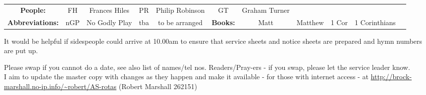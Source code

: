 \documentclass[10pt]{article}
\begin{document}
\begin{center}
\vspace{1em}
\begin{tabular}{|c|c|c|c|c|c|c|c|c|c|c|}\hline
{\bf People: } &
 FH & Frances Hiles &
PR & Philip Robinson &
 GT & Graham Turner & & & \\ %
{\bf Abbreviations:}
& nGP & No Godly Play 
& tba & to be arranged 
& {\bf Books: } & Matt & Matthew  & 1 Cor & 1 Corinthians\\
     \hline
  \end{tabular}
\end{center}
\begin{minipage}{0.7\textwidth}
{\footnotesize It would be helpful if sidespeople 
could arrive at 10.00am to ensure that service sheets and notice sheets are 
prepared and hymn numbers are put up.

Please swap if you cannot do a date, see also list of names/tel nos.
Readers/Pray-ers - if you swap, please let the service leader know.\\
I aim to update the master copy with changes as they
happen and make it available - for those with internet access
\linebreak - at
\url{http://brock-marshall.no-ip.info/~robert/AS-rotas}
(Robert Marshall 262151)}
\end{minipage}
\end{document}
